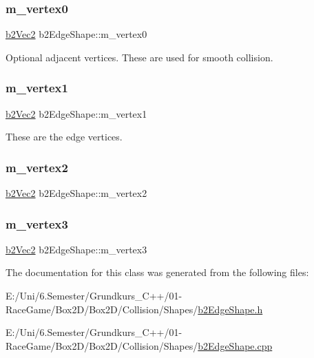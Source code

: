 \mbox{\label{classb2_edge_shape_a907c9829484cc1ba7527ab368e9fdf93}} 
\subsubsection{\texorpdfstring{m\_vertex0}{m\_vertex0}}
{\footnotesize\ttfamily \mbox{\hyperlink{structb2_vec2}{b2\+Vec2}} b2\+Edge\+Shape\+::m\+\_\+vertex0}



Optional adjacent vertices. These are used for smooth collision. 

\mbox{\label{classb2_edge_shape_a916cf02a752ff1a70db35b2edaf19bb4}} 
\subsubsection{\texorpdfstring{m\_vertex1}{m\_vertex1}}
{\footnotesize\ttfamily \mbox{\hyperlink{structb2_vec2}{b2\+Vec2}} b2\+Edge\+Shape\+::m\+\_\+vertex1}



These are the edge vertices. 

\mbox{\label{classb2_edge_shape_aa218bfe2bf135e4e94028b29aaa32fce}} 
\subsubsection{\texorpdfstring{m\_vertex2}{m\_vertex2}}
{\footnotesize\ttfamily \mbox{\hyperlink{structb2_vec2}{b2\+Vec2}} b2\+Edge\+Shape\+::m\+\_\+vertex2}

\mbox{\label{classb2_edge_shape_a7991fd8b38806a7785748cd991c18452}} 
\subsubsection{\texorpdfstring{m\_vertex3}{m\_vertex3}}
{\footnotesize\ttfamily \mbox{\hyperlink{structb2_vec2}{b2\+Vec2}} b2\+Edge\+Shape\+::m\+\_\+vertex3}



The documentation for this class was generated from the following files\+:\begin{DoxyCompactItemize}
\item 
E\+:/\+Uni/6.\+Semester/\+Grundkurs\+\_\+\+C++/01-\/\+Race\+Game/\+Box2\+D/\+Box2\+D/\+Collision/\+Shapes/\mbox{\hyperlink{b2_edge_shape_8h}{b2\+Edge\+Shape.\+h}}\item 
E\+:/\+Uni/6.\+Semester/\+Grundkurs\+\_\+\+C++/01-\/\+Race\+Game/\+Box2\+D/\+Box2\+D/\+Collision/\+Shapes/\mbox{\hyperlink{b2_edge_shape_8cpp}{b2\+Edge\+Shape.\+cpp}}\end{DoxyCompactItemize}
